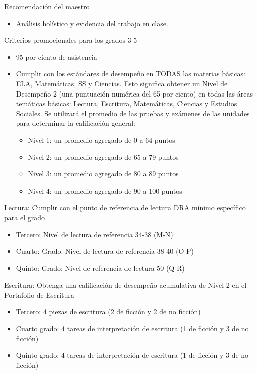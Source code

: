 \documentclass[12pt,letterpaper]{article}
\begin{document}
Recomendación del maestro
\begin{itemize}
\item Análisis holístico y evidencia del trabajo en clase.
\end{itemize}

Criterios promocionales para los grados 3-5
\begin{itemize}
\item 95 por ciento de asistencia
\item Cumplir con los estándares de desempeño en TODAS las materias básicas: ELA, Matemáticas, SS y Ciencias. Esto significa obtener un Nivel de Desempeño 2 (una puntuación numérica del 65 por ciento) en todas las áreas temáticas básicas: Lectura, Escritura, Matemáticas, Ciencias y Estudios Sociales. Se utilizará el promedio de las pruebas y exámenes de las unidades para determinar la calificación general:
	\begin{itemize}
	\item Nivel 1: un promedio agregado de 0 a 64 puntos
	\item Nivel 2: un promedio agregado de 65 a 79 puntos
	\item Nivel 3: un promedio agregado de 80 a 89 puntos
	\item Nivel 4: un promedio agregado de 90 a 100 puntos
	\end{itemize}
\end{itemize}

Lectura: Cumplir con el punto de referencia de lectura DRA mínimo específico para el grado
\begin{itemize}
\item Tercero: Nivel de lectura de referencia 34-38 (M-N)
\item Cuarto: Grado: Nivel de lectura de referencia 38-40 (O-P)
\item Quinto: Grado: Nivel de referencia de lectura 50 (Q-R)
\end{itemize}
\pagebreak
\vspace*{1.5cm}
Escritura: Obtenga una calificación de desempeño acumulativa de Nivel 2 en el Portafolio de Escritura
\begin{itemize}
\item Tercero: 4 piezas de escritura (2 de ficción y 2 de no ficción)
\item Cuarto grado: 4 tareas de interpretación de escritura (1 de ficción y 3 de no ficción)
\item Quinto grado: 4 tareas de interpretación de escritura (1 de ficción y 3 de no ficción)
\end{itemize}
\end{document}
